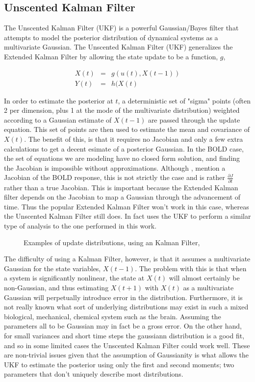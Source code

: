 \subsection{Unscented Kalman Filter}
\label{sec:Unscented Kalman Filter}
The Unscented Kalman Filter (UKF) is a powerful Gaussian/Bayes filter that attempts
to model the posterior distribution of dynamical systems as a multivariate
Gaussian. The Unscented Kalman Filter (UKF) generalizes the Extended Kalman
Filter by allowing the state update to be a function, $g$,

\begin{eqnarray}
X(t) &=& g(u(t), X(t-1))\\
Y(t) &=& h(X(t)
\end{eqnarray}

In order to estimate the posterior at $t$, a deterministic set of "sigma" points 
(often 2 per dimension, plus 1 at the mode of the multivariate distribution)
weighted according to a Gaussian estimate of $X(t-1)$ are passed through
the update equation. This set of points are then used to estimate the 
mean and covariance of $X(t)$. The benefit of this, is that it requires
no Jacobian and only a few extra calculations to get a decent esimate of
a posterior Gaussian. In the BOLD case, the set of equations we are modeling have no 
closed form solution, and finding the Jacobian is impossible without approximations. Although 
\cite{Riera2004}, \cite{Hu2009} mention a Jacobian of the BOLD response, this is
not strictly the case and is rather $\frac{\partial J}{\partial t}$
rather than a true Jacobian.  This is important because the Extended
Kalman filter depends on the Jacobian to map a Gaussian through the 
advancement of time. Thus the popular Extended Kalman Filter won't work
in this case, whereas the Unscented Kalman Filter still does. In fact
\cite{Hu2009} uses the UKF to perform a similar type of analysis to
the one performed in this work. 

\begin{figure}
\caption{Examples of update distributions, using an Kalman Filter, \cite{Thrun2005}}
\label{fig:EKFWorking}
\end{figure}

The difficulty
of using a Kalman Filter, however, is that it assumes a multivariate 
Gaussian for the state variables, $X(t-1)$. The problem with this is that 
when a system is significantly nonlinear, the state at 
$X(t)$ will almost certainly be non-Gaussian, and thus estimating
$X(t+1)$ with $X(t)$ as a multivariate Gaussian will perpetually introduce
error in the distribution. Furthermore, it is not really known what 
sort of underlying distributions may exist in such a mixed biological,
mechanical, chemical system such as the brain. Assuming the parameters
all to be Gaussian may in fact be a gross error. On the other hand, for
small variances and short time steps the gaussiann distribution is a good 
fit, and so in some limited cases the Unscented Kalman Filter could work
well. These are 
non-trivial issues given that the assumption of Gaussianity is what allows
the UKF to estimate the posterior using only the first and second moments;
two parameters that don't uniquely describe most distributions.


